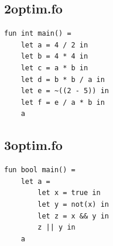 \documentclass[11pt]{article}
\begin{document}
    \subsection{2optim.fo}
    \begin{lstlisting}[basicstyle=\small]
fun int main() =
    let a = 4 / 2 in
    let b = 4 * 4 in
    let c = a * b in
    let d = b * b / a in
    let e = ~((2 - 5)) in
    let f = e / a * b in
    a
    \end{lstlisting}

    \subsection{3optim.fo}
    \begin{lstlisting}[basicstyle=\small]
fun bool main() =
    let a =
        let x = true in
        let y = not(x) in
        let z = x && y in
        z || y in
    a
    \end{lstlisting}
\end{document}
